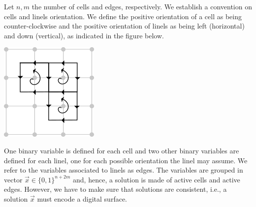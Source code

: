 Let $n,m$ the number of cells and edges, respectively. We establish a convention on cells and linels orientation. We define the positive orientation of a cell as being counter-clockwise and the positive orientation of linels as being left (horizontal) and down (vertical), as indicated in the figure below. 

\begin{center}
\includegraphics[scale=0.6]{figures/chapter3/schoenemann/schoenemann_cell_linel_orientation.png}
\end{center}

One binary variable is defined for each cell and two other binary variables are defined for each linel, one for each possible orientation the linel may assume. We refer to the variables associated to linels as edges. The variables are grouped in vector $\vec{x} \in \{0,1\}^{n+2m}$ and, hence, a solution is made of active cells and active edges. However, we have to make sure that solutions are consistent, i.e., a solution $\vec{x}$ must encode a digital surface. 

